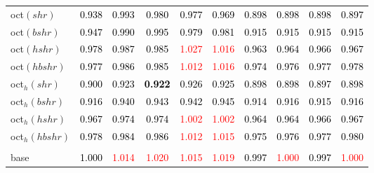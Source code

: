 \begin{tabular}[t]{>{\centering\arraybackslash}m{2.5cm}ccccccccc}
oct$(shr)$ & \textcolor{black}{0.938} & \textcolor{black}{0.993} & \textcolor{black}{0.980} & \textcolor{black}{0.977} & \textcolor{black}{0.969} & \textcolor{black}{0.898} & \textcolor{black}{0.898} & \textcolor{black}{0.898} & \textcolor{black}{0.897}\\
oct$(bshr)$ & \textcolor{black}{0.947} & \textcolor{black}{0.990} & \textcolor{black}{0.995} & \textcolor{black}{0.979} & \textcolor{black}{0.981} & \textcolor{black}{0.915} & \textcolor{black}{0.915} & \textcolor{black}{0.915} & \textcolor{black}{0.915}\\
oct$(hshr)$ & \textcolor{black}{0.978} & \textcolor{black}{0.987} & \textcolor{black}{0.985} & \textcolor{red}{1.027} & \textcolor{red}{1.016} & \textcolor{black}{0.963} & \textcolor{black}{0.964} & \textcolor{black}{0.966} & \textcolor{black}{0.967}\\
oct$(hbshr)$ & \textcolor{black}{0.977} & \textcolor{black}{0.986} & \textcolor{black}{0.985} & \textcolor{red}{1.012} & \textcolor{red}{1.016} & \textcolor{black}{0.974} & \textcolor{black}{0.976} & \textcolor{black}{0.977} & \textcolor{black}{0.978}\\
oct$_h(shr)$ & \textcolor{black}{0.900} & \textcolor{black}{0.923} & \textcolor{black}{\textbf{0.922}} & \textcolor{black}{0.926} & \textcolor{black}{0.925} & \textcolor{black}{0.898} & \textcolor{black}{0.898} & \textcolor{black}{0.897} & \textcolor{black}{0.898}\\
oct$_h(bshr)$ & \textcolor{black}{0.916} & \textcolor{black}{0.940} & \textcolor{black}{0.943} & \textcolor{black}{0.942} & \textcolor{black}{0.945} & \textcolor{black}{0.914} & \textcolor{black}{0.916} & \textcolor{black}{0.915} & \textcolor{black}{0.916}\\
oct$_h(hshr)$ & \textcolor{black}{0.967} & \textcolor{black}{0.974} & \textcolor{black}{0.974} & \textcolor{red}{1.002} & \textcolor{red}{1.002} & \textcolor{black}{0.964} & \textcolor{black}{0.964} & \textcolor{black}{0.966} & \textcolor{black}{0.967}\\
oct$_h(hbshr)$ & \textcolor{black}{0.978} & \textcolor{black}{0.984} & \textcolor{black}{0.986} & \textcolor{red}{1.012} & \textcolor{red}{1.015} & \textcolor{black}{0.975} & \textcolor{black}{0.976} & \textcolor{black}{0.977} & \textcolor{black}{0.980}\\
\addlinespace[0.3em]
\multicolumn{10}{c}{\textbf{$k = 1$}}\\
base & \textcolor{black}{1.000} & \textcolor{red}{1.014} & \textcolor{red}{1.020} & \textcolor{red}{1.015} & \textcolor{red}{1.019} & \textcolor{black}{0.997} & \textcolor{red}{1.000} & \textcolor{black}{0.997} & \textcolor{red}{1.000}\\

\end{tabular}
